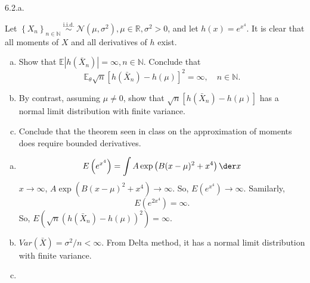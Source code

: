 \begin{solution}
    6.2.a. 
\end{solution}

\begin{ex}
    Let \(\left\{X_{n}\right\}_{n \in \mathbb{N}} \stackrel{\text { i.i.d. }}{\sim} \mathcal{N}\left(\mu, \sigma^{2}\right), \mu \in \mathbb{R}, \sigma^{2}>0\), and let \(h(x)=e^{x^{4}}\). It is clear that all moments of \(X\) and all derivatives of \(h\) exist. 
    \begin{enumerate}[(a)]
        \item Show that \(\mathbb{E}\left|h\left(\bar{X}_{n}\right)\right|=\infty, n \in \mathbb{N}\). Conclude that
        \[
            \mathbb{E}_{\theta} \sqrt{n}\left[h\left(\bar{X}_{n}\right)-h(\mu)\right]^{2}=\infty, \quad n \in \mathbb{N} .
        \]
        \item By contrast, assuming \(\mu \neq 0\), show that \(\sqrt{n}\left[h\left(\bar{X}_{n}\right)-h(\mu)\right]\) has a normal limit distribution with finite variance. 
        \item Conclude that the theorem seen in class on the approximation of moments does require bounded derivatives. 
    \end{enumerate}
\end{ex}

\begin{solution}
    \begin{enumerate}[(a)]
        \item \[
            E\left(e^{x^4}\right)=\int A\exp\left(B(x-\mu)^2+x^4\right)\der x
        \]
        $x\to\infty$, $A\exp\left(B(x-\mu)^2+x^4\right)\to\infty$. So, $E\left(e^{x^4}\right)\to\infty$. Samilarly, 
        \[
            E(e^{2x^4})=\infty. 
        \]
        So, $E(\sqrt{n}(h(\bar{X}_n)-h(\mu))^2)=\infty$. 
        \item $Var(\bar{X})=\sigma^2/n<\infty$. From Delta method, it has a normal limit distribution with finite variance. 
        \item 
    \end{enumerate}
\end{solution}

